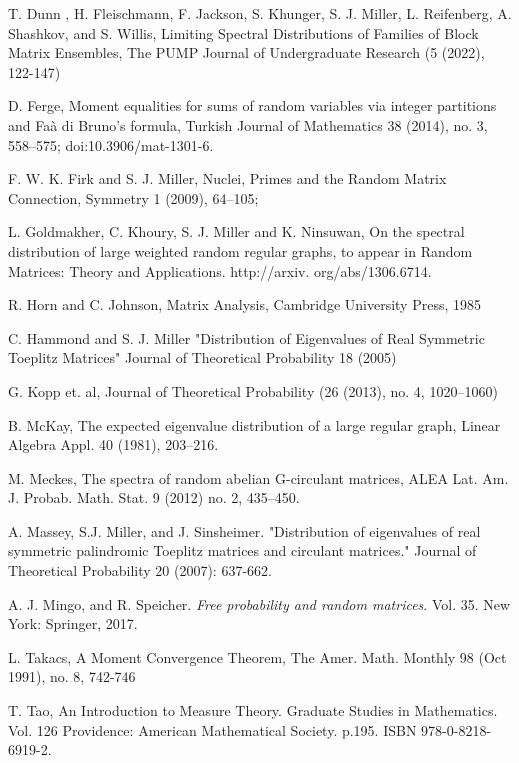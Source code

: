 \documentclass[11pt,reqno]{amsart}
\numberwithin{equation}{section}
\theoremstyle{plain}
\begin{document}
\begin{thebibliography}{BCDHMSTPY}
T. Dunn , H. Fleischmann, F. Jackson, S. Khunger, S. J. Miller, L. Reifenberg, A. Shashkov, and S. Willis, Limiting Spectral Distributions of Families of Block Matrix Ensembles, The PUMP Journal of Undergraduate Research (5 (2022), 122-147)

D. Ferge, Moment equalities for sums of random variables via integer partitions and Faà di Bruno’s formula, Turkish Journal of Mathematics 38 (2014), no. 3, 558–575; doi:10.3906/mat-1301-6.

F. W. K. Firk and S. J. Miller, Nuclei, Primes and the Random Matrix Connection, Symmetry 1 (2009), 64–105;

L. Goldmakher, C. Khoury, S. J. Miller and K. Ninsuwan, On the spectral distribution of large weighted random regular graphs, to appear in Random Matrices: Theory and Applications. http://arxiv. org/abs/1306.6714.

R. Horn and C. Johnson, Matrix Analysis, Cambridge University Press, 1985

C. Hammond and S. J. Miller "Distribution of Eigenvalues of Real Symmetric Toeplitz Matrices" Journal of Theoretical Probability 18 (2005)

G. Kopp et. al, Journal of Theoretical Probability  (26 (2013), no. 4, 1020--1060)

B. McKay, The expected eigenvalue distribution of a large regular graph, Linear Algebra Appl. 40 (1981), 203–216.

M. Meckes, The spectra of random abelian G-circulant matrices, ALEA Lat. Am. J. Probab. Math. Stat. 9 (2012) no. 2, 435–450.

A. Massey, S.J. Miller, and J. Sinsheimer. "Distribution of eigenvalues of real symmetric palindromic Toeplitz matrices and circulant matrices." Journal of Theoretical Probability 20 (2007): 637-662.

A. J. Mingo, and R. Speicher. \emph{Free probability and random matrices}. Vol. 35. New York: Springer, 2017.

L. Takacs, A Moment Convergence Theorem, The Amer. Math. Monthly 98 (Oct 1991), no. 8, 742-746

T. Tao, An Introduction to Measure Theory. Graduate Studies in Mathematics. Vol. 126 Providence: American Mathematical Society. p.195. ISBN 978-0-8218-6919-2.


\end{thebibliography}
\end{document}
